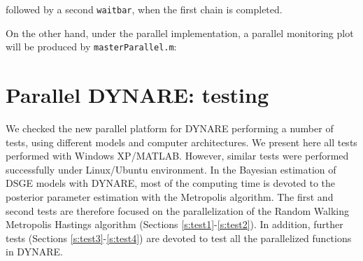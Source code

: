 \documentclass[12pt,a4paper,pdftex]{article}
\def\ni{{\noindent}}
\begin{document}
\hspace{2cm}\epsfxsize=200pt 

\ni followed by a second \texttt{waitbar}, when the first chain is completed.

\hspace{2cm}\epsfxsize=200pt 

On the other hand, under the parallel implementation, a parallel monitoring plot will be produced by \texttt{masterParallel.m}:

\hspace{2cm}\epsfxsize=200pt 



%
%
%
%

%


\section{Parallel DYNARE: testing}
We checked the new parallel platform for DYNARE performing a number of tests, using different models and computer architectures. We present here all tests performed with Windows XP/MATLAB. However, similar tests were performed successfully under Linux/Ubuntu environment.
In the Bayesian estimation of DSGE models with DYNARE, most of the computing time is devoted to the posterior parameter estimation with the Metropolis algorithm. The first and second tests are therefore focused on the parallelization of the Random Walking Metropolis Hastings algorithm (Sections \ref{s:test1}-\ref{s:test2}). In addition, further tests (Sections \ref{s:test3}-\ref{s:test4}) are devoted to test all the parallelized functions in DYNARE. %
\end{document}
